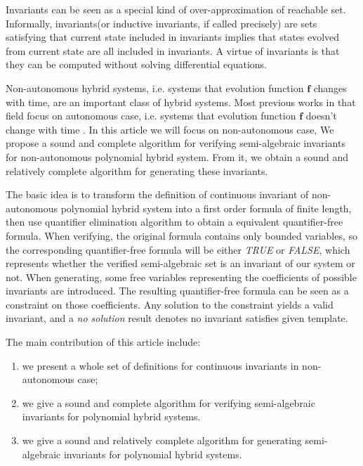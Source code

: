 \documentclass{jssc}
\begin{document}
Invariants can be seen as a special kind of over-approximation of reachable set. Informally, invariants(or inductive invariants, if called precisely) are sets satisfying that current state included in invariants implies that states evolved from current state are all included in invariants. A virtue of invariants is that they can be computed without solving differential equations.

Non-autonomous hybrid systems, i.e. systems that evolution function $\boldsymbol{f}$ changes with time, are an important class of hybrid systems. Most previous works in that field focus on autonomous case, i.e. systems that evolution function $\boldsymbol{f}$ doesn't change with time \cite{liu2011computing}. In this article we will focus on non-autonomous case, We propose a sound and complete algorithm for verifying semi-algebraic invariants for non-autonomous polynomial hybrid system. From it, we obtain a sound and relatively complete algorithm for generating these invariants.

The basic idea is to transform the definition of continuous invariant of non-autonomous polynomial hybrid system into a first order formula of finite length, then use quantifier elimination algorithm to obtain a equivalent quantifier-free formula. When verifying, the original formula contains only bounded variables, so the corresponding quantifier-free  formula will be either \emph{TRUE} or \emph{FALSE}, which represents whether the verified semi-algebraic set is an invariant of our system or not. When generating, some free variables representing the coefficients of possible invariants are introduced. The resulting quantifier-free formula can be seen as a constraint on those coefficients. Any solution to the constraint yields a valid invariant, and a \emph{no solution} result denotes no invariant satisfies given template.

The main contribution of this article include: 
\begin{enumerate}
	\item we present a whole set of definitions for continuous invariants in non-autonomous case; 
	\item we give a sound and complete algorithm for verifying semi-algebraic invariants for polynomial hybrid systems.
	\item we give a sound and relatively complete algorithm for generating semi-algebraic invariants for polynomial hybrid systems.
\end{enumerate}
\end{document}
